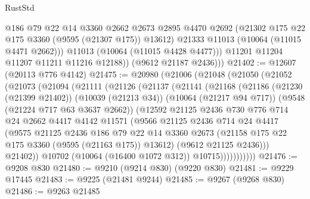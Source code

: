 \begin{lexlean}{RustStd}
\begin{coremodule}
                @186
                @79
                @22
                @14
                @3360
                @2662
                @2673
                @2895
                @4470
                @2692
                (@21302 @175 @22 @175 @3360 (@9595 (@21307 @175)) @13612)
                @21333
                @11013
                (@10064 (@11015 @4471 @2662)))
              @11013
              (@10064 (@11015 @4428 @4477)))
            @11201
            @11204
            @11207
            @11211
            @11216
            @12188))
        (@9612 @21187 @2436)))
@21402 := @12607 (@20113 @776 @4142)
@21475 := @20980
    (@21006
      (@21048
        (@21050
          (@21052
            (@21073
              (@21094
                (@21111
                  (@21126
                    (@21137
                      (@21141
                        (@21168
                          (@21186
                            (@21230 (@21399 @21402))
                            (@10039 (@21213 @34))
                            (@10064 (@21217 @94 @717))
                            (@9548 (@21224 @717 @63 @3637 @2662))
                            (@12592
                              @21125
                              @2436
                              @730
                              @776
                              @714
                              @24
                              @2662
                              @4417
                              @4142
                              @11571
                              (@9566
                                @21125
                                @2436
                                @714
                                @24
                                @4417
                                (@9575
                                  @21125
                                  @2436
                                  @186
                                  @79
                                  @22
                                  @14
                                  @3360
                                  @2673
                                  (@21158 @175 @22 @175 @3360 (@9595 (@21163 @175)) @13612)
                                  (@9612 @21125 @2436)))
                              @21402))
                          @10702
                          (@10064 (@16400 @1072 @312))
                          @10715)))))))))))
@21476 := @9208 @830
@21480 := @9210 (@9214 @830) (@9220 @830)
@21481 := @9229 @17445
@21483 := @9225 (@21481 @9244)
@21485 := @9267 (@9268 @830)
@21486 := @9263 @21485

\end{coremodule}
\end{lexlean}

